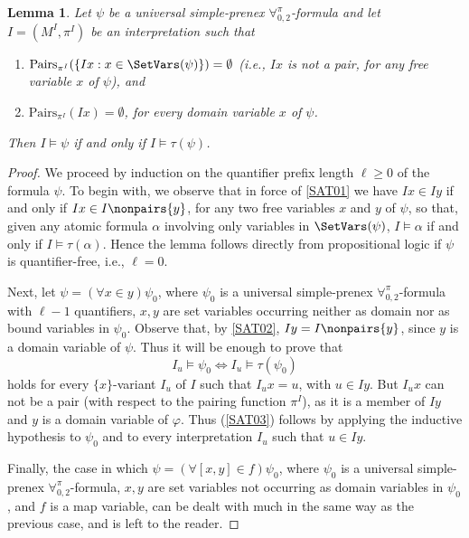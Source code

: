 \documentclass[submission,copyright,creativecommons]{eptcs}
\newtheorem{lemma}{Lemma}
\newcommand{\Lang}{\ensuremath{\mathbf{\forall}^{\pi}_{0,2}}\xspace}
\newcommand{\assignment}[1]{M^{#1}}
\newcommand{\pairf}[1]{\pi^{#1}}
\newcommand{\inter}{I}
\newcommand{\ipairf}{\pairf{\inter}}
\newcommand{\iassignment}{\assignment{\inter}}
\newcommand{\pairs}[2]{\mathrm{Pairs}_{\pi^{#1}}(#2)}
\newcommand{\svx}{x}
\newcommand{\svy}{y}
\newcommand{\mvx}{f}
\newcommand{\sx}{u}
\begin{document}
\begin{lemma}\label{SAT0}
Let $\psi$ be a universal simple-prenex \Lang-formula and let 
$\inter = (\iassignment, \ipairf)$
be an interpretation such that
\begin{enumerate}[label=(\roman{*}), ref=(\roman{*})]
  \item\label{SAT01} $\pairs{\inter}{\{ \inter \svx : \svx \in
  \SetVars(\psi)\}} = \emptyset$ (i.e., $\inter x$ is not a pair, for
  any free variable $x$ of $\psi$), and

  \item\label{SAT02} $\pairs{\inter}{\inter \svx} = \emptyset$, for
  every domain variable $\svx$ of $\psi$.
\end{enumerate}
Then $\inter \models \psi$ 
if and only if $\inter \models \tau(\psi)$.
\end{lemma}
\begin{proof}
We proceed by induction on the quantifier prefix length $\ell \geq 0$
of the formula $\psi$.  To begin with, we observe that in force of
\ref{SAT01} we have $\inter \svx \in \inter \svy$ if and only if
$\inter \svx \in \inter \nonpairs{\svy}$, for any two free variables
$x$ and $y$ of $\psi$, so that, given any atomic formula $\alpha$
involving only variables in $\SetVars(\psi)$, $\inter \models \alpha$
if and only if $\inter \models \tau(\alpha)$.  Hence the lemma follows
directly from propositional logic if $\psi$ is quantifier-free, i.e.,
$\ell = 0$.

Next, let $\psi=(\forall \svx \in \svy)\psi_0$, where $\psi_0$ is a
universal simple-prenex \Lang-formula with $\ell - 1$ quantifiers,
$\svx, \svy$ are set variables occurring neither as domain nor as
bound variables in $\psi_0$.  Observe that, by
\ref{SAT02}, $\inter \svy = \inter \nonpairs{\svy}$, since $\svy$ is a
domain variable of $\psi$.  Thus
it will be enough to prove that 
\begin{equation}\label{SAT03}
\inter_{\sx} \models \psi_0 \iff \inter_{\sx} \models \tau(\psi_0) 
\end{equation}
holds for every $\{\svx\}$-variant $\inter_{\sx}$ of $\inter$ such
that $\inter_{\sx} \svx=\sx$, with $\sx \in \inter \svy$.  But
$\inter_{\sx} \svx$ can not be a pair (with respect to the pairing
function $\ipairf$), as it is a member of $\inter \svy$ and $\svy$ is
a domain variable of $\varphi$.  Thus (\ref{SAT03}) follows by
applying the inductive hypothesis to $\psi_0$ and to every
interpretation $\inter_{\sx}$ such that $\sx \in \inter \svy$.

Finally, the case in which $\psi=(\forall [\svx, \svy] \in
\mvx)\psi_0$, where $\psi_0$ is a universal simple-prenex
\Lang-formula, $\svx, \svy$ are set variables not occurring as domain
variables in $\psi_0$, and $\mvx$ is a map variable, can be dealt with
much in the same way as the previous case, and is left to the
reader.
\end{proof}
\end{document}
